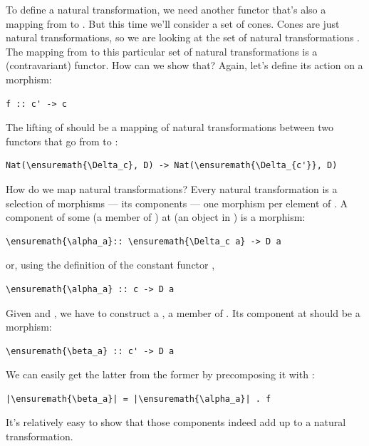 \noindent
To define a natural transformation, we need another functor that's also
a mapping from  to . But this time we'll consider a
set of cones. Cones are just natural transformations, so we are looking
at the set of natural transformations . The mapping
from  to this particular set of natural transformations is a
(contravariant) functor. How can we show that? Again, let's define its
action on a morphism:

\begin{verbatim}
f :: c' -> c
\end{verbatim}
The lifting of  should be a mapping of natural transformations
between two functors that go from  to :

\begin{Verbatim}[commandchars=\\\{\}]
Nat(\ensuremath{\Delta_c}, D) -> Nat(\ensuremath{\Delta_{c'}}, D)
\end{Verbatim}
How do we map natural transformations? Every natural transformation is a
selection of morphisms --- its components --- one morphism per element
of . A component of some \mathtext{\alpha} (a member of ) at
 (an object in ) is a morphism:

\begin{Verbatim}[commandchars=\\\{\}]
\ensuremath{\alpha_a}:: \ensuremath{\Delta_c a} -> D a
\end{Verbatim}
or, using the definition of the constant functor \mathtext{\Delta},

\begin{Verbatim}[commandchars=\\\{\}]
\ensuremath{\alpha_a} :: c -> D a
\end{Verbatim}
Given  and \mathtext{\alpha}, we have to construct a \mathtext{\beta}, a member of
. Its component at  should be a
morphism:

\begin{Verbatim}[commandchars=\\\{\}]
\ensuremath{\beta_a} :: c' -> D a
\end{Verbatim}
We can easily get the latter from the former by precomposing it with
:

\begin{Verbatim}[commandchars=\\\{\}]
|\ensuremath{\beta_a}| = |\ensuremath{\alpha_a}| . f
\end{Verbatim}
It's relatively easy to show that those components indeed add up to a
natural transformation.

